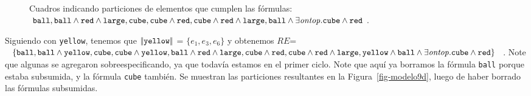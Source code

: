 \begin{figure}[h]
\begin{center}
\\[0pt]
\caption{Cuadros indicando particiones de elementos que cumplen las f\'ormulas: $\texttt{ball}, \texttt{ball} \wedge \texttt{red} \wedge \texttt{large}, \texttt{cube},\texttt{cube} \wedge \texttt{red}, \texttt{cube} \wedge \texttt{red} \wedge \texttt{large},\texttt{ball} \wedge \exists \mathit{ontop}. \texttt{cube} \wedge \texttt{red}$.}
\label{fig-modelo9c}
\end{center}
\end{figure}

Siguiendo con \texttt{yellow}, tenemos que $|\!|\texttt{yellow}|\!|$ = $\{e_1, e_3, e_6\}$ y obtenemos $RE$= $\{\texttt{ball},\texttt{ball} \wedge \texttt{yellow}, \texttt{cube}, \texttt{cube} \wedge \texttt{yellow}, \texttt{ball} \wedge \texttt{red} \wedge \texttt{large}, \texttt{cube} \wedge \texttt{red}, \texttt{cube} \wedge \texttt{red} \wedge \texttt{large}, \texttt{yellow} \wedge \texttt{ball} \wedge \exists \mathit{ontop}.\texttt{cube} \wedge \texttt{red} \}$. Note que algunas se agregaron sobreespecificando, ya que todav\'ia estamos en el primer ciclo.
Note que aqu\'i ya borramos la f\'ormula \texttt{ball} porque estaba subsumida, y la f\'ormula \texttt{cube} tambi\'en. Se muestran las particiones resultantes en la Figura~\ref{fig-modelo9d}, luego de haber borrado las f\'ormulas subsumidas.


